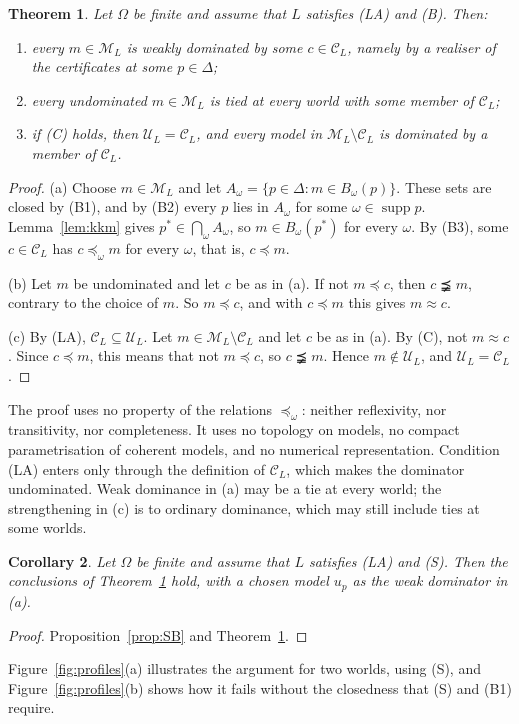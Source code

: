 \documentclass[11pt]{article}
\newtheorem{theorem}{Theorem}[section]
\newtheorem{corollary}[theorem]{Corollary}
\theoremstyle{definition}
\theoremstyle{remark}
\newcommand{\M}{\mathcal M}
\newcommand{\C}{\mathcal C}
\newcommand{\U}{\mathcal U}
\newcommand{\supp}{\operatorname{supp}}
\begin{document}
\begin{theorem}\label{thm:main}
Let $\Omega$ be finite and assume that $L$ satisfies (LA) and (B). Then:
\begin{enumerate}[label=(\alph*)]
\item every $m\in\M_L$ is weakly dominated by some $c\in\C_L$, namely by a realiser of the certificates at some $p\in\Delta$;
\item every undominated $m\in\M_L$ is tied at every world with some member of $\C_L$;
\item if (C) holds, then $\U_L=\C_L$, and every model in $\M_L\setminus\C_L$ is dominated by a member of $\C_L$.
\end{enumerate}
\end{theorem}
\begin{proof}
(a) Choose $m\in\M_L$ and let $A_\omega=\{p\in\Delta:m\in B_\omega(p)\}$. These sets are closed by (B1), and by (B2) every $p$ lies in $A_\omega$ for some $\omega\in\supp p$. Lemma~\ref{lem:kkm} gives $p^*\in\bigcap_\omega A_\omega$, so $m\in B_\omega(p^*)$ for every $\omega$. By (B3), some $c\in\C_L$ has $c\preceq_\omega m$ for every $\omega$, that is, $c\preceq m$.

(b) Let $m$ be undominated and let $c$ be as in (a). If not $m\preceq c$, then $c\precneqq m$, contrary to the choice of $m$. So $m\preceq c$, and with $c\preceq m$ this gives $m\approx c$.

(c) By (LA), $\C_L\subseteq\U_L$. Let $m\in\M_L\setminus\C_L$ and let $c$ be as in (a). By (C), not $m\approx c$. Since $c\preceq m$, this means that not $m\preceq c$, so $c\precneqq m$. Hence $m\notin\U_L$, and $\U_L=\C_L$.
\end{proof}
The proof uses no property of the relations $\preceq_\omega$: neither reflexivity, nor transitivity, nor completeness. It uses no topology on models, no compact parametrisation of coherent models, and no numerical representation. Condition (LA) enters only through the definition of $\C_L$, which makes the dominator undominated. Weak dominance in (a) may be a tie at every world; the strengthening in (c) is to ordinary dominance, which may still include ties at some worlds.

\begin{corollary}\label{cor:S}
Let $\Omega$ be finite and assume that $L$ satisfies (LA) and (S). Then the conclusions of Theorem~\ref{thm:main} hold, with a chosen model $u_p$ as the weak dominator in (a).
\end{corollary}
\begin{proof}
Proposition~\ref{prop:SB} and Theorem~\ref{thm:main}.
\end{proof}
Figure~\ref{fig:profiles}(a) illustrates the argument for two worlds, using (S), and Figure~\ref{fig:profiles}(b) shows how it fails without the closedness that (S) and (B1) require.
\end{document}
